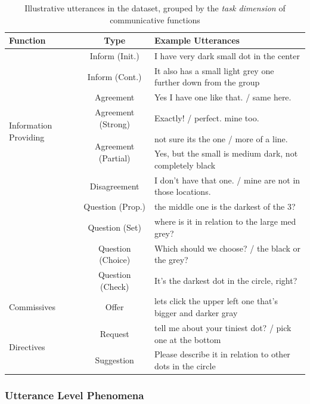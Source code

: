 \documentclass[letterpaper]{article}
\begin{document}
\begin{table}[htb]
\centering
\begin{tabular}{lcl}
\toprule
Function & Type & Example Utterances\\
\midrule
\multirow{8}{*}{Information Providing} & \multirow{1}{*}{Inform (Init.)} & I have very dark small dot in the center \\
& \multirow{1}{*}{Inform (Cont.)} & It also has a small light grey one further down from the group \\
& \multirow{1}{*}{Agreement} & Yes I have one like that. / same here. \\
& \multirow{1}{*}{Agreement (Strong)} & Exactly! / perfect. mine too. \\
& \multirow{2}{*}{Agreement (Partial)} & not sure its the one / more of a line. \\
& & Yes, but the small is medium dark, not completely black \\
& \multirow{1}{*}{Disagreement} & I don't have that one. / mine are not in those locations. \\
\midrule
\multirow{4}{*}{Information Seeking} & \multirow{1}{*}{Question (Prop.)} & the middle one is the darkest of the 3? \\
& \multirow{1}{*}{Question (Set)} & where is it in relation to the large med grey? \\
& \multirow{1}{*}{Question (Choice)} & Which should we choose? / the black or the grey? \\
& \multirow{1}{*}{Question (Check)} & It's the darkest dot in the circle, right? \\
\midrule
\multirow{1}{*}{Commissives} & \multirow{1}{*}{Offer} & lets click the upper left one that's bigger and darker gray \\
\midrule
\multirow{2}{*}{Directives} & \multirow{1}{*}{Request} & tell me about your tiniest dot? / pick one at the bottom \\
& \multirow{1}{*}{Suggestion} & Please describe it in relation to other dots in the circle \\
\bottomrule
\end{tabular}
\caption{\label{speechact}
Illustrative utterances in the dataset, grouped by the \emph{task dimension} of communicative functions \cite{bunt2017dialogue}}
\end{table}

\subsubsection{Utterance Level Phenomena}
\end{document}
